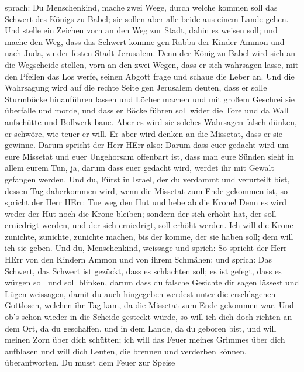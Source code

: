 sprach:  Du Menschenkind, mache zwei Wege, durch welche
kommen soll das Schwert des Königs zu Babel; sie sollen aber alle beide
aus einem Lande gehen.  Und stelle ein Zeichen vorn an den
Weg zur Stadt, dahin es weisen soll; und mache den Weg, dass das Schwert
komme gen Rabba der Kinder Ammon und nach Juda, zu der festen Stadt
Jerusalem.  Denn der König zu Babel wird sich an die
Wegscheide stellen, vorn an den zwei Wegen, dass er sich wahrsagen
lasse, mit den Pfeilen das Los werfe, seinen Abgott frage und schaue die
Leber an.  Und die Wahrsagung wird auf die rechte Seite gen
Jerusalem deuten, dass er solle Sturmböcke hinanführen lassen und Löcher
machen und mit großem Geschrei sie überfalle und morde, und dass er
Böcke führen soll wider die Tore und da Wall aufschütte und Bollwerk
baue.  Aber es wird sie solches Wahrsagen falsch dünken, er
schwöre, wie teuer er will. Er aber wird denken an die Missetat, dass er
sie gewinne.  Darum spricht der Herr HErr also: Darum dass
euer gedacht wird um eure Missetat und euer Ungehorsam offenbart ist,
dass man eure Sünden sieht in allem eurem Tun, ja, darum dass euer
gedacht wird, werdet ihr mit Gewalt gefangen werden.  Und
du, Fürst in Israel, der du verdammt und verurteilt bist, dessen Tag
daherkommen wird, wenn die Missetat zum Ende gekommen ist, 
so spricht der Herr HErr: Tue weg den Hut und hebe ab die Krone! Denn es
wird weder der Hut noch die Krone bleiben; sondern der sich erhöht hat,
der soll erniedrigt werden, und der sich erniedrigt, soll erhöht werden.
 Ich will die Krone zunichte, zunichte, zunichte machen,
bis der komme, der sie haben soll; dem will ich sie geben. 
Und du, Menschenkind, weissage und sprich: So spricht der Herr HErr von
den Kindern Ammon und von ihrem Schmähen; und sprich: Das Schwert, das
Schwert ist gezückt, dass es schlachten soll; es ist gefegt, dass es
würgen soll und soll blinken,  darum dass du falsche
Gesichte dir sagen lässest und Lügen weissagen, damit du auch hingegeben
werdest unter die erschlagenen Gottlosen, welchen ihr Tag kam, da die
Missetat zum Ende gekommen war.  Und ob's schon wieder in
die Scheide gesteckt würde, so will ich dich doch richten an dem Ort, da
du geschaffen, und in dem Lande, da du geboren bist,  und
will meinen Zorn über dich schütten; ich will das Feuer meines Grimmes
über dich aufblasen und will dich Leuten, die brennen und verderben
können, überantworten.  Du musst dem Feuer zur Speise
